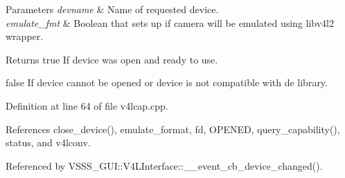 \begin{DoxyParams}{Parameters}
{\em devname} & Name of requested device. \\
\hline
{\em emulate\+\_\+fmt} & Boolean that sets up if camera will be emulated using libv4l2 wrapper. \\
\hline
\end{DoxyParams}
\begin{DoxyReturn}{Returns}
true If device was open and ready to use. 

false If device cannot be opened or device is not compatible with de library. 
\end{DoxyReturn}


Definition at line 64 of file v4lcap.\+cpp.



References close\+\_\+device(), emulate\+\_\+format, fd, O\+P\+E\+N\+ED, query\+\_\+capability(), status, and v4lconv.



Referenced by V\+S\+S\+S\+\_\+\+G\+U\+I\+::\+V4\+L\+Interface\+::\+\_\+\+\_\+event\+\_\+cb\+\_\+device\+\_\+changed().


